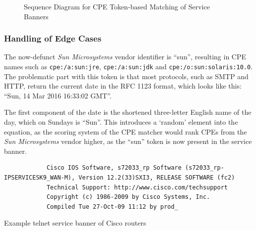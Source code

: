\documentclass[a4paper,12pt]{article}
\begin{document}
\begin{figure}[!htbp]
		\caption{Sequence Diagram for CPE Token-based Matching of Service Banners}
		\label{seqtoken}
	\end{figure}
	
\subsubsection{Handling of Edge Cases} \label{cpeedges}
 

	The now-defunct \textit{Sun Microsystems} vendor identifier is ``sun'', resulting in CPE names such as \texttt{cpe:/a:sun:jre}, \texttt{cpe:/a:sun:jdk} and \texttt{cpe:/o:sun:solaris:10.0}. The problematic part with this token is that most protocols, such as SMTP and HTTP, return the current date in the RFC 1123 format\cite{rfc2616}, which looks like this: ``Sun, 14 Mar 2016 16:33:02 GMT''.
	
	The first component of the date is the shortened three-letter English name of the day, which on Sundays is ``Sun''. This introduces a `random' element into the equation, as the scoring system of the CPE matcher would rank CPEs from the \textit{Sun Microsystems} vendor higher, as the ``sun'' token is now present in the service banner.
	
	\begin{listing}[H]
		\begin{verbatim}
			Cisco IOS Software, s72033_rp Software (s72033_rp-IPSERVICESK9_WAN-M), Version 12.2(33)SXI3, RELEASE SOFTWARE (fc2)
			Technical Support: http://www.cisco.com/techsupport
			Copyright (c) 1986-2009 by Cisco Systems, Inc.
			Compiled Tue 27-Oct-09 11:12 by prod_
		\end{verbatim}
		\caption{Example telnet service banner of Cisco routers}
		\label{ciscosvcbnr}
	\end{listing}
\end{document}

